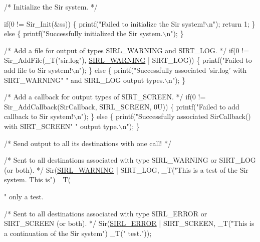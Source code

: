 \begin{DoxyCode}
\textcolor{comment}{/*}
\textcolor{comment}{  Initialize the Sir system.}
\textcolor{comment}{ */}

  \textcolor{keywordflow}{if}(0 != Sir\_Init(&ss)) \{
    printf(\textcolor{stringliteral}{"Failed to initialize the Sir system!\(\backslash\)n"});
    \textcolor{keywordflow}{return} 1;
  \} \textcolor{keywordflow}{else} \{
    printf(\textcolor{stringliteral}{"Successfully initialized the Sir system.\(\backslash\)n"});
  \}

\textcolor{comment}{/*}
\textcolor{comment}{  Add a file for output of types SIRL\_WARNING and SIRT\_LOG.}
\textcolor{comment}{ */}
  \textcolor{keywordflow}{if}(0 != Sir\_AddFile(\_T(\textcolor{stringliteral}{"sir.log"}), \hyperlink{sir_8h_a06fc87d81c62e9abb8790b6e5713c55ba1ff2ba86cf1863e3673e5f534e021181}{SIRL\_WARNING} | SIRT\_LOG)) \{
    printf(\textcolor{stringliteral}{"Failed to add file to Sir system!\(\backslash\)n"});
  \} \textcolor{keywordflow}{else} \{
    printf(\textcolor{stringliteral}{"Successfully associated 'sir.log' with SIRT\_WARNING"}
           \textcolor{stringliteral}{" and SIRL\_LOG output types.\(\backslash\)n"});
  \}

\textcolor{comment}{/*}
\textcolor{comment}{  Add a callback for output types of SIRT\_SCREEN.}
\textcolor{comment}{ */}
  \textcolor{keywordflow}{if}(0 != Sir\_AddCallback(SirCallback, SIRL\_SCREEN, 0U)) \{
    printf(\textcolor{stringliteral}{"Failed to add callback to Sir system!\(\backslash\)n"});
  \} \textcolor{keywordflow}{else} \{
    printf(\textcolor{stringliteral}{"Successfully associated SirCallback() with SIRT\_SCREEN"}
           \textcolor{stringliteral}{" output type.\(\backslash\)n"});
  \}

\textcolor{comment}{/*}
\textcolor{comment}{  Send output to all its destinations with one call!}
\textcolor{comment}{ */}

\textcolor{comment}{/*}
\textcolor{comment}{  Sent to all destinations associated with type SIRL\_WARNING or SIRT\_LOG}
\textcolor{comment}{  (or both).}
\textcolor{comment}{ */}
  Sir(\hyperlink{sir_8h_a06fc87d81c62e9abb8790b6e5713c55ba1ff2ba86cf1863e3673e5f534e021181}{SIRL\_WARNING} | SIRT\_LOG, \_T(\textcolor{stringliteral}{"This is a test of the Sir system. This is"})
      \_T(\textcolor{stringliteral}{" only a test. %

\textcolor{comment}{/*}
\textcolor{comment}{  Sent to all destinations associated with type SIRL\_ERROR or SIRT\_SCREEN}
\textcolor{comment}{  (or both).}
\textcolor{comment}{ */}
  Sir(\hyperlink{sir_8h_a06fc87d81c62e9abb8790b6e5713c55ba9c687f088db1de838ea5d5f8a8beed76}{SIRL\_ERROR} | SIRT\_SCREEN, \_T(\textcolor{stringliteral}{"This is a continuation of the Sir system"})
      \_T(\textcolor{stringliteral}{" test."}));

}
\end{DoxyCode}
